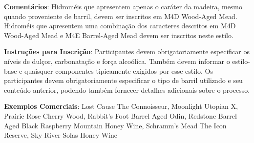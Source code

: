 \textbf{Comentários}: Hidroméis que apresentem apenas o caráter da madeira, mesmo quando proveniente de barril, devem ser inscritos em M4D Wood-Aged Mead. Hidroméis que apresentem uma combinação dos caracteres descritos em M4D Wood-Aged Mead e M4E Barrel-Aged Mead devem ser inscritos neste estilo.

\textbf{Instruções para Inscrição}: Participantes devem obrigatoriamente especificar os níveis de dulçor, carbonatação e força alcoólica. Também devem informar o estilo-base e quaisquer componentes tipicamente exigidos por esse estilo. Os participantes devem obrigatoriamente especificar o tipo de barril utilizado e seu conteúdo anterior, podendo também fornecer detalhes adicionais sobre o processo.

\textbf{Exemplos Comerciais}: Lost Cause The Connoisseur, Moonlight Utopian X, Prairie Rose Cherry Wood, Rabbit's Foot Barrel Aged Odin, Redstone Barrel Aged Black Raspberry Mountain Honey Wine, Schramm's Mead The Icon Reserve, Sky River Solas Honey Wine